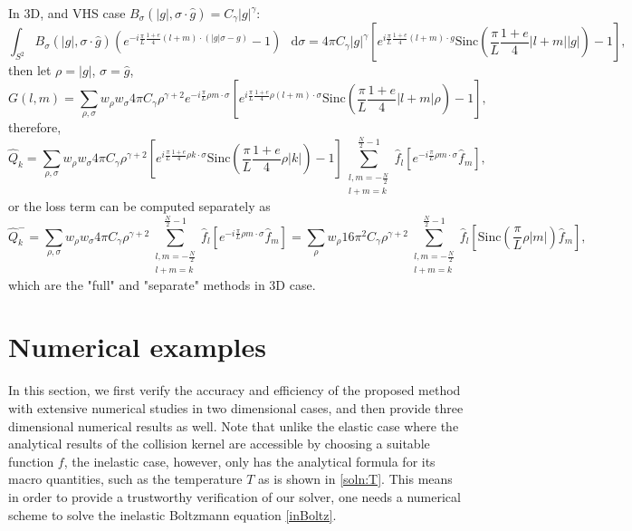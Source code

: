 \documentclass[review, times]{elsarticle}
\newcommand*\diff{\mathop{}\!\mathrm{d}}
\begin{document}
In 3D, and VHS case $B_{\sigma}(|g|,\sigma\cdot \hat{g})=C_{\gamma}|g|^{\gamma}$:
\begin{equation}
\int_{S^2}B_{\sigma}(|g|,\sigma\cdot \hat{g})\left(e^{-i\frac{\pi}{L}\frac{1+e}{4}(l+m)\cdot (|g|\sigma-g)}-1\right)\,\diff{\sigma}=4\pi C_{\gamma}|g|^{\gamma}\left[ e^{i\frac{\pi}{L}\frac{1+e}{4}(l+m)\cdot g}\text{Sinc}\left(\frac{\pi}{L}\frac{1+e}{4}|l+m||g|\right)-1\right],
\end{equation}
then let $\rho=|g|$, $\sigma=\hat{g}$,
\begin{equation}
G(l,m)=\sum_{\rho,\sigma}w_{\rho}w_{\sigma}4\pi C_{\gamma}\rho^{\gamma+2}e^{-i\frac{\pi}{L}\rho m \cdot \sigma}\left[ e^{i\frac{\pi}{L}\frac{1+e}{4}\rho (l+m)\cdot \sigma}\text{Sinc}\left(\frac{\pi}{L}\frac{1+e}{4}|l+m|\rho\right)-1\right],
\end{equation}
therefore,
\begin{equation} 
\hat{Q}_k=\sum_{\rho,\sigma}w_{\rho}w_{\sigma}4\pi C_{\gamma}\rho^{\gamma+2}\left[ e^{i\frac{\pi}{L}\frac{1+e}{4}\rho k\cdot \sigma}\text{Sinc}\left(\frac{\pi}{L}\frac{1+e}{4}\rho |k|\right)-1\right]\sum_{\substack{l,m=-\frac{N}{2}\\l+m=k}}^{\frac{N}{2}-1}\hat{f}_l \left[e^{-i\frac{\pi}{L}\rho m \cdot \sigma}\hat{f}_m\right],
\end{equation} 
or the loss term can be computed separately as
\begin{equation} 
\hat{Q}_k^-=\sum_{\rho,\sigma}w_{\rho}w_{\sigma}4\pi C_{\gamma}\rho^{\gamma+2}\sum_{\substack{l,m=-\frac{N}{2}\\l+m=k}}^{\frac{N}{2}-1}\hat{f}_l \left[e^{-i\frac{\pi}{L}\rho m \cdot \sigma}\hat{f}_m\right]=\sum_{\rho}w_{\rho}16\pi^2 C_{\gamma}\rho^{\gamma+2}\sum_{\substack{l,m=-\frac{N}{2}\\l+m=k}}^{\frac{N}{2}-1}\hat{f}_l \left[\text{Sinc}\left(\frac{\pi}{L}\rho |m|\right)\hat{f}_m\right],
\end{equation}
which are the "full" and "separate" methods in 3D case.

\section{Numerical examples}

In this section, we first verify the accuracy and efficiency of the proposed method with extensive numerical studies in two dimensional cases, and then provide three dimensional numerical results as well. Note that unlike the elastic case where the analytical results of the collision kernel are accessible by choosing a suitable function $f$, the inelastic case, however, only has the analytical formula for its macro quantities, such as the temperature $T$ as is shown in \eqref{soln:T}. This means in order to provide a trustworthy verification of our solver, one needs a numerical scheme to solve the inelastic Boltzmann equation \eqref{inBoltz}.
\end{document}
